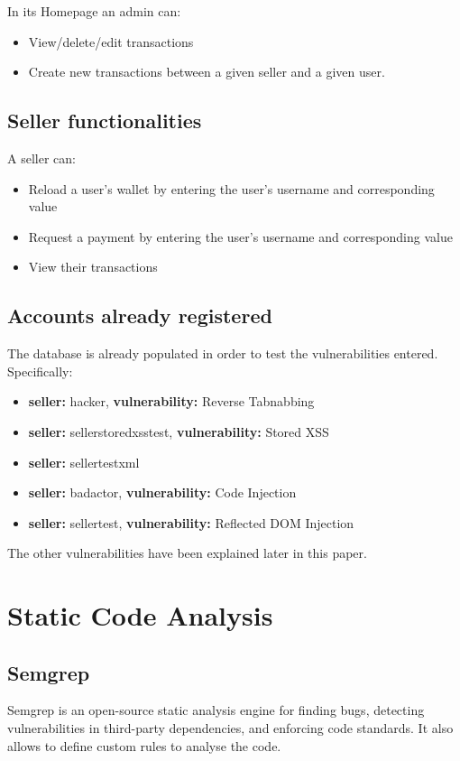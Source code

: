 \documentclass[]{article}
\begin{document}
In its Homepage an admin can:
\begin{itemize}
    \item View/delete/edit transactions
    \item Create new transactions between a given seller and a given user. 
\end{itemize}

\subsection{Seller functionalities}
A seller can:
\begin{itemize}
    \item Reload a user's wallet by entering the user's username and corresponding value
    \item Request a payment by entering the user's username and corresponding value
    \item View their transactions 
\end{itemize}

\subsection{Accounts already registered}
The database is already populated in order to test the vulnerabilities entered. Specifically:
\begin{itemize}
    \item \textbf{seller:} hacker, \textbf{vulnerability:} Reverse Tabnabbing
    \item \textbf{seller:} sellerstoredxsstest, \textbf{vulnerability:} Stored XSS
    \item \textbf{seller:} sellertestxml
    \item \textbf{seller:} badactor, \textbf{vulnerability:} Code Injection 
    \item \textbf{seller:} sellertest, \textbf{vulnerability:} Reflected DOM Injection
\end{itemize}
The other vulnerabilities have been explained later in this paper.

\newpage

\section{Static Code Analysis}

\subsection{Semgrep}
Semgrep is an open-source static analysis engine for finding bugs, detecting vulnerabilities in third-party dependencies, 
and enforcing code standards. It also allows to define custom rules to analyse the code. 
\end{document}
